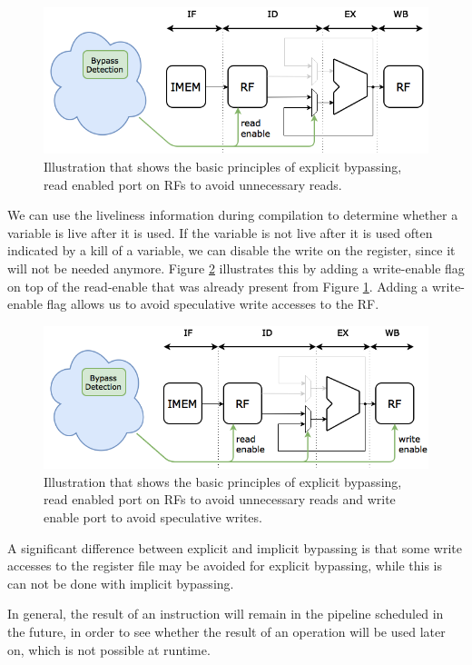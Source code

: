 \begin{figure}[H]
\centering
\includegraphics[width=.7\textwidth]{figures/expl_bypassing_principle/01_explicit_bypassing_principle}
\caption{Illustration that shows the basic principles of explicit bypassing, read enabled port on RFs to avoid unnecessary reads.}
\label{fig:exp_bypass_principle_r}
\end{figure}

We can use the liveliness information during compilation to determine whether a variable is live after it is used. If the variable is not live after it is used often indicated by a kill of a variable, we can disable the write on the register, since it will not be needed anymore. Figure \ref{fig:exp_bypass_principle_rw} illustrates this by adding a write-enable flag on top of the read-enable that was already present from Figure \ref{fig:exp_bypass_principle_r}. Adding a write-enable flag allows us to avoid speculative write accesses to the RF.

\begin{figure}[t]
\centering
\includegraphics[width=.7\textwidth]{figures/expl_bypassing_principle/02_explicit_bypassing_principle}
\caption{Illustration that shows the basic principles of explicit bypassing, read enabled port on RFs to avoid unnecessary reads and write enable port to avoid speculative writes.}
\label{fig:exp_bypass_principle_rw}
\end{figure}

A significant difference between explicit and implicit bypassing is that some write accesses to the register file may be avoided for explicit bypassing, while this is can not be done with implicit bypassing.

In general, the result of an instruction will remain in the pipeline  scheduled in the future, in order to see whether the result of an operation will be used later on, which is not possible at runtime.

